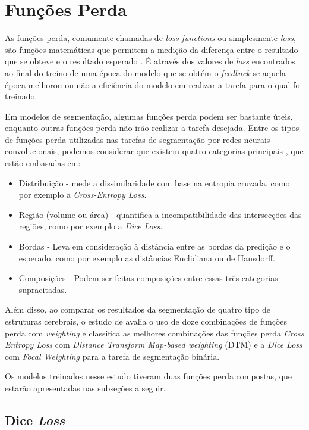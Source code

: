 \section{Funções Perda}

As funções perda, comumente chamadas de \textit{loss functions} ou simplesmente \textit{loss}, são funções matemáticas que permitem a medição da diferença entre o resultado que se obteve e o resultado esperado \cite{Chollet:2017}. É através dos valores de \textit{loss} encontrados ao final do treino de uma época do modelo que se obtém o \textit{feedback} se aquela época melhorou ou não a eficiência do modelo em realizar a tarefa para o qual foi treinado.

Em modelos de segmentação, algumas funções perda podem ser bastante úteis, enquanto outras funções perda não irão realizar a tarefa desejada. Entre os tipos de funções perda utilizadas nas tarefas de segmentação por redes neurais convolucionais, podemos considerar que existem quatro categorias principais \cite{Sugino:2021}, que estão embasadas em:
\begin{itemize}
    \item Distribuição - mede a dissimilaridade com base na entropia cruzada, como por exemplo a \textit{Cross-Entropy Loss}.
    \item Região (volume ou área) - quantifica a incompatibilidade das intersecções das regiões, como por exemplo a \textit{Dice Loss}.
    \item Bordas - Leva em consideração à distância entre as bordas da predição e o esperado, como por exemplo as distâncias Euclidiana ou de Hausdorff.
    \item Composições - Podem ser feitas composições entre essas três categorias supracitadas.
\end{itemize}

Além disso, ao comparar os resultados da segmentação de quatro tipo de estruturas cerebrais, o estudo de \cite{Sugino:2021} avalia o uso de doze combinações de funções perda com \textit{weighting} e classifica as melhores combinações das funções perda \textit{Cross Entropy Loss} com \textit{Distance Transform Map-based weighting} (DTM) e a \textit{Dice Loss} com \textit{Focal Weighting} para a tarefa de segmentação binária.

Os modelos treinados nesse estudo tiveram duas funções perda compostas, que estarão apresentadas nas subseções a seguir.

\subsection{Dice \textit{Loss}}

